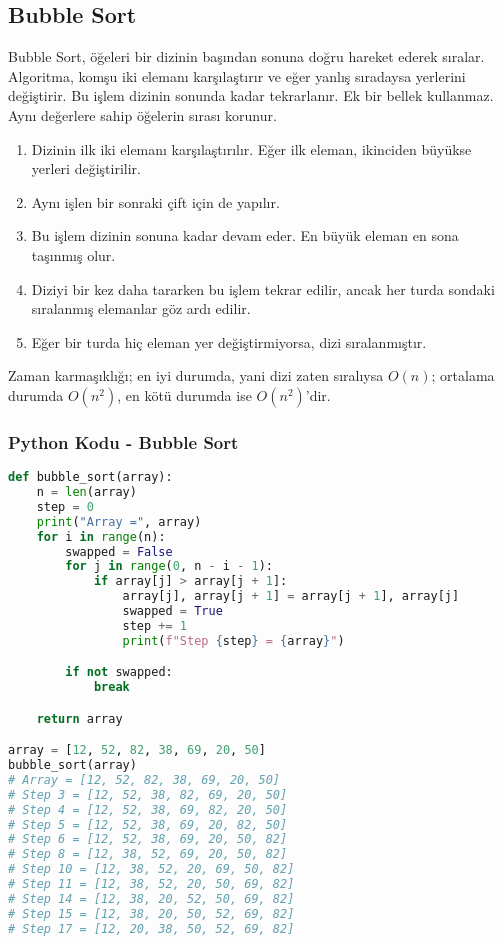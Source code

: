 \newpage

\subsection{Bubble Sort}

Bubble Sort, öğeleri bir dizinin başından sonuna doğru hareket ederek sıralar. Algoritma, komşu iki elemanı karşılaştırır ve eğer yanlış sıradaysa yerlerini değiştirir. Bu işlem dizinin sonunda kadar tekrarlanır. Ek bir bellek kullanmaz. Aynı değerlere sahip öğelerin sırası korunur.

\begin{enumerate}
    \item Dizinin ilk iki elemanı karşılaştırılır. Eğer ilk eleman, ikinciden büyükse yerleri değiştirilir.
    \item Aynı işlen bir sonraki çift için de yapılır.
    \item Bu işlem dizinin sonuna kadar devam eder. En büyük eleman en sona taşınmış olur.
    \item Diziyi bir kez daha tararken bu işlem tekrar edilir, ancak her turda sondaki sıralanmış elemanlar göz ardı edilir.
    \item Eğer bir turda hiç eleman yer değiştirmiyorsa, dizi sıralanmıştır.
\end{enumerate}

Zaman karmaşıklığı; en iyi durumda, yani dizi zaten sıralıysa $O(n)$; ortalama durumda $O(n^2)$, en kötü durumda ise $O(n^2)$'dir.

\subsubsection{Python Kodu - Bubble Sort}

\begin{lstlisting}[language=Python]
def bubble_sort(array):
    n = len(array)
    step = 0
    print("Array =", array)
    for i in range(n):
        swapped = False
        for j in range(0, n - i - 1):
            if array[j] > array[j + 1]:
                array[j], array[j + 1] = array[j + 1], array[j]
                swapped = True
                step += 1
                print(f"Step {step} = {array}")

        if not swapped:
            break

    return array

array = [12, 52, 82, 38, 69, 20, 50]
bubble_sort(array)
# Array = [12, 52, 82, 38, 69, 20, 50]
# Step 3 = [12, 52, 38, 82, 69, 20, 50]
# Step 4 = [12, 52, 38, 69, 82, 20, 50]
# Step 5 = [12, 52, 38, 69, 20, 82, 50]
# Step 6 = [12, 52, 38, 69, 20, 50, 82]
# Step 8 = [12, 38, 52, 69, 20, 50, 82]
# Step 10 = [12, 38, 52, 20, 69, 50, 82]
# Step 11 = [12, 38, 52, 20, 50, 69, 82]
# Step 14 = [12, 38, 20, 52, 50, 69, 82]
# Step 15 = [12, 38, 20, 50, 52, 69, 82]
# Step 17 = [12, 20, 38, 50, 52, 69, 82]
\end{lstlisting}

